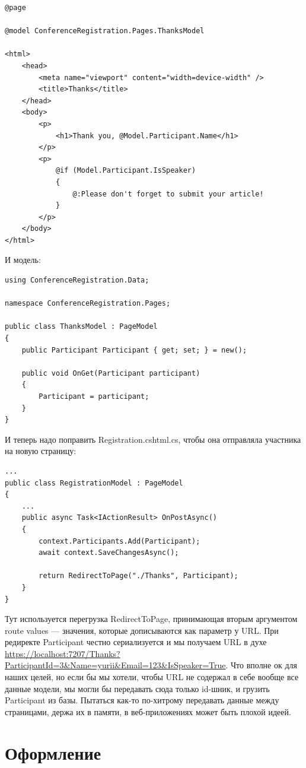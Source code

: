 \documentclass{../../text-style}
\begin{document}
\begin{verbatim}
@page

@model ConferenceRegistration.Pages.ThanksModel

<html>
    <head>
        <meta name="viewport" content="width=device-width" />
        <title>Thanks</title>
    </head>
    <body>
        <p>
            <h1>Thank you, @Model.Participant.Name</h1>
        </p>
        <p>
            @if (Model.Participant.IsSpeaker)
            {
                @:Please don't forget to submit your article!
            }
        </p>
    </body>
</html>
\end{verbatim}

И модель: 

\begin{verbatim}
using ConferenceRegistration.Data;

namespace ConferenceRegistration.Pages;

public class ThanksModel : PageModel
{
    public Participant Participant { get; set; } = new();

    public void OnGet(Participant participant)
    {
        Participant = participant;
    }
}
\end{verbatim}

И теперь надо поправить Registration.cshtml.cs, чтобы она отправляла участника на новую страницу:

\begin{verbatim}
...
public class RegistrationModel : PageModel
{
    ...
    public async Task<IActionResult> OnPostAsync()
    {
        context.Participants.Add(Participant);
        await context.SaveChangesAsync();

        return RedirectToPage("./Thanks", Participant);
    }
}
\end{verbatim}

Тут используется перегрузка RedirectToPage, принимающая вторым аргументом route values --- значения, которые дописываются как параметр у URL. При редиректе Participant честно сериализуется и мы получаем URL в духе \url{https://localhost:7207/Thanks?ParticipantId=3&Name=yurii&Email=123&IsSpeaker=True}. Что вполне ок для наших целей, но если бы мы хотели, чтобы URL не содержал в себе вообще все данные модели, мы могли бы передавать сюда только id-шник, и грузить Participant из базы. Пытаться как-то по-хитрому передавать данные между страницами, держа их в памяти, в веб-приложениях может быть плохой идеей.

\section{Оформление}
\end{document}
